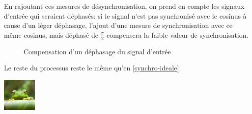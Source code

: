\documentclass{article}
\begin{document}
En rajoutant ces mesures de désynchronisation, on prend en compte les signaux d'entrée qui seraient déphasés: si le signal n'est pas synchronisé avec le cosinus à cause d'un léger déphasage, l'ajout d'une mesure de synchronisation avec ce même cosinus, mais déphasé de $\frac{\pi}{2}$ compensera la faible valeur de synchronisation.

\begin{figure}[H]
	\centering
	\caption{Compensation d'un déphasage du signal d'entrée}
	\label{fig:compensation-dephasage}
\end{figure}

Le reste du processus reste le même qu'en \ref{synchro-ideale}

\begin{figure}

\end{figure}


\begin{center}
    \includegraphics[width=0.125\textwidth]{frog.jpg}
\end{center}
\end{document}
